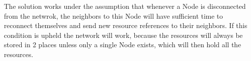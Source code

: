 The solution works under the assumption that whenever a Node is disconnected from the netwrok, the neighbors to this Node will have sufficient time to reconnect themselves and send new resource references to their neighbors. If this condition is upheld the network will work, because the resources will always be stored in 2 places unless only a single Node exists, which will then hold all the resources.
